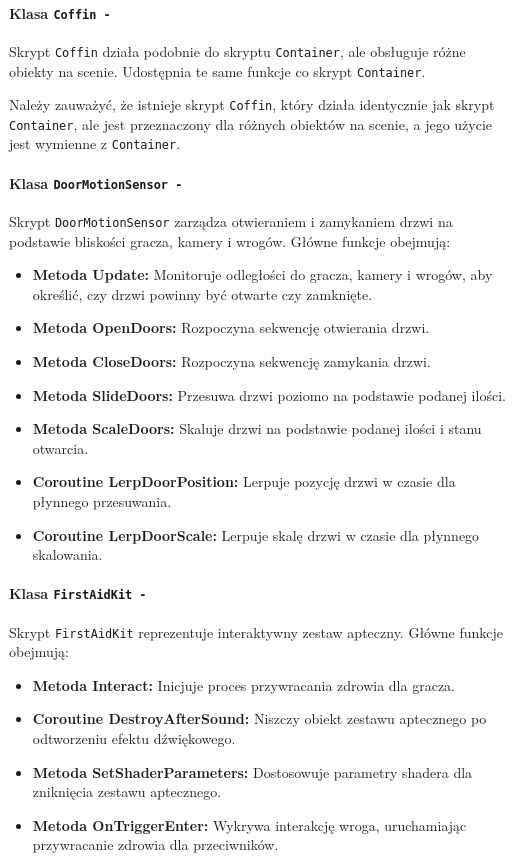 \paragraph{Klasa \texttt{Coffin -}}
Skrypt \texttt{Coffin} działa podobnie do skryptu \texttt{Container}, ale obsługuje różne obiekty na scenie. Udostępnia te same funkcje co skrypt \texttt{Container}.

Należy zauważyć, że istnieje skrypt \texttt{Coffin}, który działa identycznie jak skrypt \texttt{Container}, ale jest przeznaczony dla różnych obiektów na scenie, a jego użycie jest wymienne z \texttt{Container}.

\paragraph{Klasa \texttt{DoorMotionSensor -}}
Skrypt \texttt{DoorMotionSensor} zarządza otwieraniem i zamykaniem drzwi na podstawie bliskości gracza, kamery i wrogów. Główne funkcje obejmują:
\begin{itemize}
  \item \textbf{Metoda Update:} Monitoruje odległości do gracza, kamery i wrogów, aby określić, czy drzwi powinny być otwarte czy zamknięte.
  \item \textbf{Metoda OpenDoors:} Rozpoczyna sekwencję otwierania drzwi.
  \item \textbf{Metoda CloseDoors:} Rozpoczyna sekwencję zamykania drzwi.
  \item \textbf{Metoda SlideDoors:} Przesuwa drzwi poziomo na podstawie podanej ilości.
  \item \textbf{Metoda ScaleDoors:} Skaluje drzwi na podstawie podanej ilości i stanu otwarcia.
  \item \textbf{Coroutine LerpDoorPosition:} Lerpuje pozycję drzwi w czasie dla płynnego przesuwania.
  \item \textbf{Coroutine LerpDoorScale:} Lerpuje skalę drzwi w czasie dla płynnego skalowania.
\end{itemize}

\paragraph{Klasa \texttt{FirstAidKit -}}
Skrypt \texttt{FirstAidKit} reprezentuje interaktywny zestaw apteczny. Główne funkcje obejmują:
\begin{itemize}
  \item \textbf{Metoda Interact:} Inicjuje proces przywracania zdrowia dla gracza.
  \item \textbf{Coroutine DestroyAfterSound:} Niszczy obiekt zestawu aptecznego po odtworzeniu efektu dźwiękowego.
  \item \textbf{Metoda SetShaderParameters:} Dostosowuje parametry shadera dla zniknięcia zestawu aptecznego.
  \item \textbf{Metoda OnTriggerEnter:} Wykrywa interakcję wroga, uruchamiając przywracanie zdrowia dla przeciwników.
\end{itemize}

